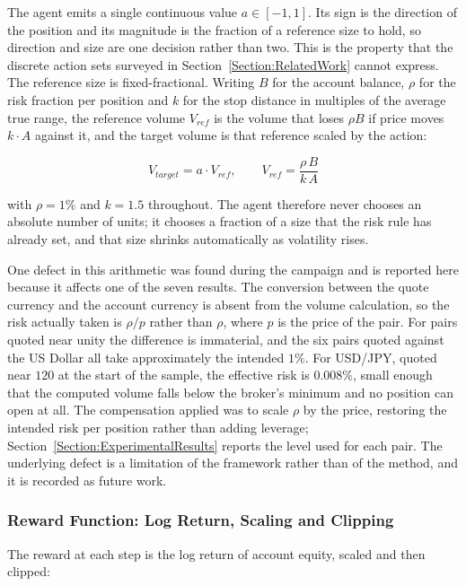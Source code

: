 The agent emits a single continuous value $a \in [-1, 1]$. Its sign is the direction of the position and its magnitude is the fraction of a reference size to hold, so direction and size are one decision rather than two. This is the property that the discrete action sets surveyed in Section~\ref{Section:RelatedWork} cannot express. The reference size is fixed-fractional. Writing $B$ for the account balance, $\rho$ for the risk fraction per position and $k$ for the stop distance in multiples of the average true range, the reference volume $V_{ref}$ is the volume that loses $\rho B$ if price moves $k \cdot A$ against it, and the target volume is that reference scaled by the action:

\begin{equation}
V_{target} = a \cdot V_{ref}, \qquad V_{ref} = \frac{\rho \, B}{k \, A}
\label{Equation:PositionSizing}
\end{equation}

with $\rho = 1\%$ and $k = 1.5$ throughout. The agent therefore never chooses an absolute number of units; it chooses a fraction of a size that the risk rule has already set, and that size shrinks automatically as volatility rises.

One defect in this arithmetic was found during the campaign and is reported here because it affects one of the seven results. The conversion between the quote currency and the account currency is absent from the volume calculation, so the risk actually taken is $\rho / p$ rather than $\rho$, where $p$ is the price of the pair. For pairs quoted near unity the difference is immaterial, and the six pairs quoted against the US Dollar all take approximately the intended $1\%$. For USD/JPY, quoted near $120$ at the start of the sample, the effective risk is $0.008\%$, small enough that the computed volume falls below the broker's minimum and no position can open at all. The compensation applied was to scale $\rho$ by the price, restoring the intended risk per position rather than adding leverage; Section~\ref{Section:ExperimentalResults} reports the level used for each pair. The underlying defect is a limitation of the framework rather than of the method, and it is recorded as future work.

\subsubsection{Reward Function: Log Return, Scaling and Clipping}

The reward at each step is the log return of account equity, scaled and then clipped:

